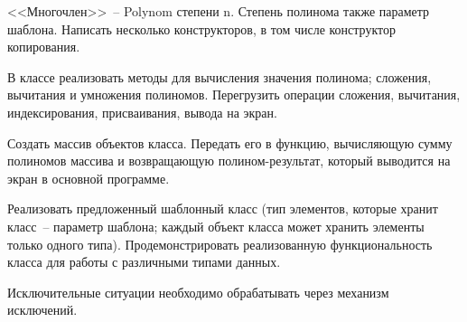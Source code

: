 
<<Многочлен>>~-- Polynom степени n. Степень полинома также параметр шаблона.
Написать несколько конструкторов, в том числе конструктор копирования.

В классе
реализовать методы для вычисления значения полинома; сложения, вычитания и
умножения полиномов. Перегрузить операции сложения, вычитания, индексирования,
присваивания, вывода на экран.

Создать массив объектов класса. Передать его в функцию,
вычисляющую сумму полиномов массива и возвращающую полином-результат, который
выводится на экран в основной программе.

Реализовать предложенный шаблонный класс (тип элементов, которые
хранит класс~-- параметр шаблона; каждый объект класса может хранить
элементы только одного типа). Продемонстрировать реализованную
функциональность класса для работы с различными типами данных.

Исключительные ситуации необходимо обрабатывать через механизм исключений.
